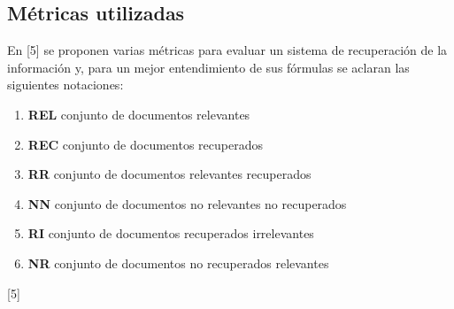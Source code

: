 \documentclass[twoside]{article}
\begin{document}
\subsection{M\'etricas utilizadas}
\qquad En [5] se proponen varias m\'etricas para evaluar un sistema de recuperaci\'on de la informaci\'on y, para un mejor entendimiento de sus f\'ormulas se aclaran las siguientes notaciones:
\begin{enumerate}
\item \textbf{REL} conjunto de documentos relevantes
\item \textbf{REC} conjunto de documentos recuperados
\item \textbf{RR} conjunto de documentos relevantes recuperados
\item \textbf{NN} conjunto de documentos no relevantes no recuperados
\item \textbf{RI} conjunto de documentos recuperados irrelevantes
\item \textbf{NR} conjunto de documentos no recuperados relevantes
\end{enumerate} [5]
\end{document}
